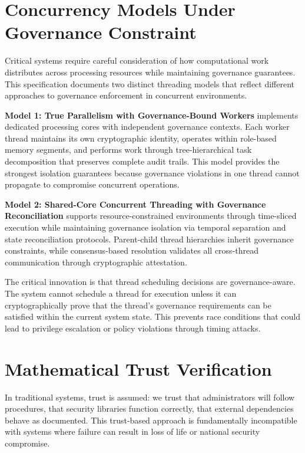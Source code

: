 \section*{Concurrency Models Under Governance Constraint}

Critical systems require careful consideration of how computational work distributes across processing resources while maintaining governance guarantees. This specification documents two distinct threading models that reflect different approaches to governance enforcement in concurrent environments.

\textbf{Model 1: True Parallelism with Governance-Bound Workers} implements dedicated processing cores with independent governance contexts. Each worker thread maintains its own cryptographic identity, operates within role-based memory segments, and performs work through tree-hierarchical task decomposition that preserves complete audit trails. This model provides the strongest isolation guarantees because governance violations in one thread cannot propagate to compromise concurrent operations.

\textbf{Model 2: Shared-Core Concurrent Threading with Governance Reconciliation} supports resource-constrained environments through time-sliced execution while maintaining governance isolation via temporal separation and state reconciliation protocols. Parent-child thread hierarchies inherit governance constraints, while consensus-based resolution validates all cross-thread communication through cryptographic attestation.

The critical innovation is that thread scheduling decisions are governance-aware. The system cannot schedule a thread for execution unless it can cryptographically prove that the thread's governance requirements can be satisfied within the current system state. This prevents race conditions that could lead to privilege escalation or policy violations through timing attacks.

\section*{Mathematical Trust Verification}

In traditional systems, trust is assumed: we trust that administrators will follow procedures, that security libraries function correctly, that external dependencies behave as documented. This trust-based approach is fundamentally incompatible with systems where failure can result in loss of life or national security compromise.

